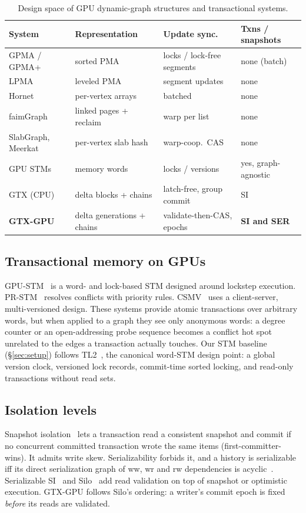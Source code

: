 \documentclass[sigconf,nonacm]{acmart}
\newcommand{\sys}{GTX-GPU}
\begin{document}
\begin{table}[t]
\caption{Design space of GPU dynamic-graph structures and transactional systems.}
\label{tab:space}
\footnotesize
\setlength{\tabcolsep}{3pt}
\begin{tabular}{@{}>{\raggedright\arraybackslash}p{1.45cm}>{\raggedright\arraybackslash}p{2.2cm}>{\raggedright\arraybackslash}p{2.1cm}>{\raggedright\arraybackslash}p{1.9cm}@{}}
\toprule
System & Representation & Update sync. & Txns / snapshots \\
\midrule
GPMA / GPMA+ & sorted PMA & locks / lock-free segments & none (batch) \\
LPMA & leveled PMA & segment updates & none \\
Hornet & per-vertex arrays & batched & none \\
faimGraph & linked pages + reclaim & warp per list & none \\
SlabGraph, Meerkat & per-vertex slab hash & warp-coop.\ CAS & none \\
GPU STMs & memory words & locks / versions & yes, graph-agnostic \\
GTX (CPU) & delta blocks + chains & latch-free, group commit & SI \\
\textbf{\sys{}} & delta generations + chains & validate-then-CAS, epochs & \textbf{SI and SER} \\
\bottomrule
\end{tabular}
\end{table}

\subsection{Transactional memory on GPUs}
GPU-STM~\cite{gpustm} is a word- and lock-based STM designed around lockstep execution. PR-STM~\cite{prstm} resolves
conflicts with priority rules. CSMV~\cite{csmv} uses a client-server, multi-versioned design. These systems provide
atomic transactions over arbitrary words, but when applied to a graph they see only anonymous words: a degree counter
or an open-addressing probe sequence becomes a conflict hot spot unrelated to the edges a transaction actually
touches. Our STM baseline (\S\ref{sec:setup}) follows TL2~\cite{tl2}, the canonical word-STM design point: a global
version clock, versioned lock records, commit-time sorted locking, and read-only transactions without read sets.

\subsection{Isolation levels}
Snapshot isolation~\cite{berenson} lets a transaction read a consistent snapshot and commit if no concurrent committed
transaction wrote the same items (first-committer-wins). It admits write skew. Serializability forbids it, and a
history is serializable iff its direct serialization graph of ww, wr and rw dependencies is acyclic~\cite{adya}.
Serializable SI~\cite{cahill} and Silo~\cite{silo} add read validation on top of snapshot or optimistic execution.
\sys{} follows Silo's ordering: a writer's commit epoch is fixed \emph{before} its reads are validated.
\end{document}
